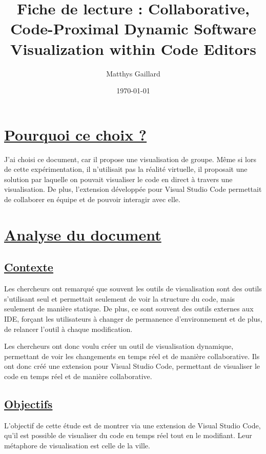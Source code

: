 \documentclass[a4paper,10pt, oneside]{article}
\title{Fiche de lecture : Collaborative, Code-Proximal Dynamic Software Visualization within Code Editors}
\author{Matthys Gaillard}
\date{\today}
\newcommand{\li}{\newline}
\begin{document}
\maketitle
\section{\ul{Pourquoi ce choix ?}}  
    \par J'ai choisi ce document\cite{A32}, car il propose une visualisation de groupe. Même si lors de cette expérimentation, il n'utilisait pas la réalité virtuelle,
    il proposait une solution par laquelle on pouvait visualiser le code en direct à travers une visualisation. De plus, l'extension développée pour Visual Studio Code
    permettait de collaborer en équipe et de pouvoir interagir avec elle.
\section{\ul{Analyse du document}}
\subsection{\ul{Contexte}}
    \par Les chercheurs ont remarqué que souvent les outils de visualisation sont des outils s'utilisant seul et permettait seulement de voir la structure du code, mais seulement
    de manière statique. De plus, ce sont souvent des outils externes aux IDE, forçant les utilisateurs à changer de permanence d'environnement et de plus, de relancer l'outil à chaque modification.\li
    \par Les chercheurs ont donc voulu créer un outil de visualisation dynamique, permettant de voir les changements en temps réel et de manière collaborative. Ils ont donc créé une extension pour Visual Studio Code, permettant de visualiser le code en temps réel et de manière collaborative.
\subsection{\ul{Objectifs}}
    \par L'objectif de cette étude est de montrer via une extension de Visual Studio Code, qu'il est possible de visualiser du code en temps réel tout en le modifiant.
    Leur métaphore de visualisation est celle de la ville.                
\end{document}
